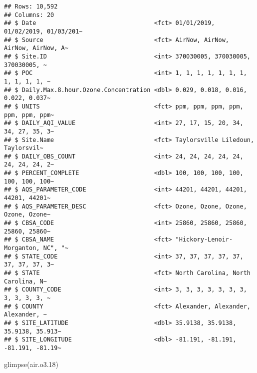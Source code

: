 \documentclass[
]{article}
\newenvironment{Shaded}{\begin{snugshade}}{\end{snugshade}}
\newcommand{\FloatTok}[1]{\textcolor[rgb]{0.00,0.00,0.81}{#1}}
\newcommand{\FunctionTok}[1]{\textcolor[rgb]{0.00,0.00,0.00}{#1}}
\newcommand{\NormalTok}[1]{#1}
\begin{document}
\begin{verbatim}
## Rows: 10,592
## Columns: 20
## $ Date                                 <fct> 01/01/2019, 01/02/2019, 01/03/201~
## $ Source                               <fct> AirNow, AirNow, AirNow, AirNow, A~
## $ Site.ID                              <int> 370030005, 370030005, 370030005, ~
## $ POC                                  <int> 1, 1, 1, 1, 1, 1, 1, 1, 1, 1, 1, ~
## $ Daily.Max.8.hour.Ozone.Concentration <dbl> 0.029, 0.018, 0.016, 0.022, 0.037~
## $ UNITS                                <fct> ppm, ppm, ppm, ppm, ppm, ppm, ppm~
## $ DAILY_AQI_VALUE                      <int> 27, 17, 15, 20, 34, 34, 27, 35, 3~
## $ Site.Name                            <fct> Taylorsville Liledoun, Taylorsvil~
## $ DAILY_OBS_COUNT                      <int> 24, 24, 24, 24, 24, 24, 24, 24, 2~
## $ PERCENT_COMPLETE                     <dbl> 100, 100, 100, 100, 100, 100, 100~
## $ AQS_PARAMETER_CODE                   <int> 44201, 44201, 44201, 44201, 44201~
## $ AQS_PARAMETER_DESC                   <fct> Ozone, Ozone, Ozone, Ozone, Ozone~
## $ CBSA_CODE                            <int> 25860, 25860, 25860, 25860, 25860~
## $ CBSA_NAME                            <fct> "Hickory-Lenoir-Morganton, NC", "~
## $ STATE_CODE                           <int> 37, 37, 37, 37, 37, 37, 37, 37, 3~
## $ STATE                                <fct> North Carolina, North Carolina, N~
## $ COUNTY_CODE                          <int> 3, 3, 3, 3, 3, 3, 3, 3, 3, 3, 3, ~
## $ COUNTY                               <fct> Alexander, Alexander, Alexander, ~
## $ SITE_LATITUDE                        <dbl> 35.9138, 35.9138, 35.9138, 35.913~
## $ SITE_LONGITUDE                       <dbl> -81.191, -81.191, -81.191, -81.19~
\end{verbatim}

\begin{Shaded}
\begin{Highlighting}[]
\FunctionTok{glimpse}\NormalTok{(air.o3}\FloatTok{.18}\NormalTok{)}
\end{Highlighting}
\end{Shaded}
\end{document}
